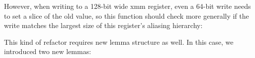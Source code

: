 
However, when writing to a 128-bit wide xmm register, even a 64-bit write needs to set a slice of the old value, so this function should check more generally if the write matches the largest size of this register's aliasing hierarchy:


This kind of refactor requires new lemma structure as well. In this case, we introduced two new lemmas:

\vspace{-5ex}
